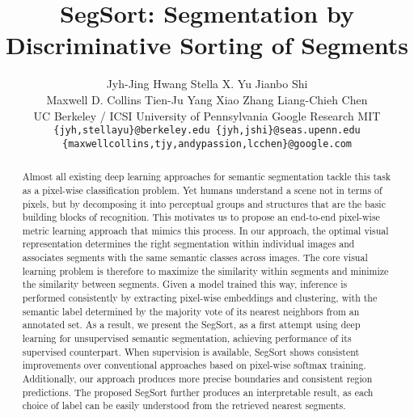 \documentclass[10pt,twocolumn,letterpaper]{article}
\begin{document}
\title{SegSort: Segmentation by Discriminative Sorting of Segments}

\author{
Jyh-Jing Hwang \quad Stella X. Yu \quad Jianbo Shi\\ 
Maxwell D. Collins \quad Tien-Ju Yang \quad Xiao Zhang \quad Liang-Chieh Chen \\
UC Berkeley / ICSI \quad University of Pennsylvania \quad Google Research \quad MIT\\
{\tt \small \{jyh,stellayu\}@berkeley.edu  \quad \{jyh,jshi\}@seas.upenn.edu} \\
{\tt \small \{maxwellcollins,tjy,andypassion,lcchen\}@google.com}
}





\maketitle
\ificcvfinal\thispagestyle{empty}\fi

\maketitle




\begin{abstract}
Almost all existing deep learning approaches for semantic segmentation tackle this task as a pixel-wise classification problem.
Yet humans understand a scene not in terms of pixels, but by decomposing it into perceptual groups and structures that are the basic building blocks of recognition.
This motivates us to propose an end-to-end pixel-wise metric learning approach that mimics this process.
In our approach, the optimal visual representation determines the right segmentation within individual images and associates segments with the same semantic classes across images.
The core visual learning problem is therefore to maximize the similarity within segments and minimize  the similarity between segments.
Given a model trained this way, inference is performed consistently by extracting pixel-wise embeddings and clustering, with the semantic label determined by the majority vote of its nearest neighbors from an annotated set.
As a result, we present the SegSort, as a first attempt using deep learning for unsupervised semantic segmentation, achieving  performance of its supervised counterpart.
When supervision is available, SegSort shows consistent improvements over conventional approaches based on pixel-wise softmax training.
Additionally, our approach produces more precise boundaries and consistent region predictions.
The proposed SegSort further produces an interpretable result, as each choice of label can be easily understood from the retrieved nearest segments.



\end{abstract}
\end{document}
